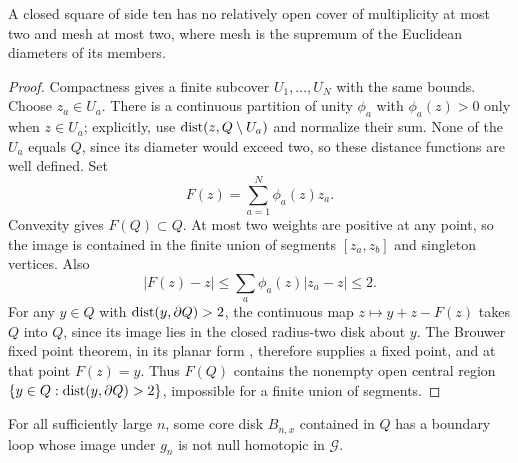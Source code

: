 \begin{lemma}
\label{lem:interfaces-cover}
A closed square of side ten has no relatively open cover of
multiplicity at most two and mesh at most two, where mesh is the
supremum of the Euclidean diameters of its members.
\end{lemma}

\begin{proof}
Compactness gives a finite subcover $U_1,\ldots,U_N$ with the same
bounds.  Choose $z_a\in U_a$.  There is a continuous partition of
unity $\phi_a$ with $\phi_a(z)>0$ only when $z\in U_a$; explicitly,
use $\operatorname{dist}(z,Q\setminus U_a)$ and normalize their sum.  None of the
$U_a$ equals $Q$, since its diameter would exceed two, so these
distance functions are well defined.  Set
\[
 F(z)=\sum_{a=1}^N\phi_a(z)z_a.
\]
Convexity gives $F(Q)\subset Q$.  At most two weights are positive
at any point, so the image is contained in the finite union of
segments $[z_a,z_b]$ and singleton vertices.  Also
\[
 |F(z)-z|
 \le\sum_a\phi_a(z)|z_a-z|\le2.
\]
For any $y\in Q$ with $\operatorname{dist}(y,\partial Q)>2$, the continuous map
$z\mapsto y+z-F(z)$ takes $Q$ into $Q$, since its image lies in
the closed radius-two disk about $y$.  The Brouwer fixed point
theorem, in its planar form
\citep[Theorem~1.9]{Hatcher2002}, therefore supplies a fixed point,
and at that point $F(z)=y$.  Thus $F(Q)$ contains the nonempty open
central region $\{y\in Q:\operatorname{dist}(y,\partial Q)>2\}$, impossible for a
finite union of segments.
\end{proof}

\begin{lemma}
\label{lem:interfaces-core-loop}
For all sufficiently large $n$, some core disk $B_{n,x}$ contained
in $Q$ has a boundary loop whose image under $g_n$ is not null
homotopic in $\mathscr G$.
\end{lemma}

